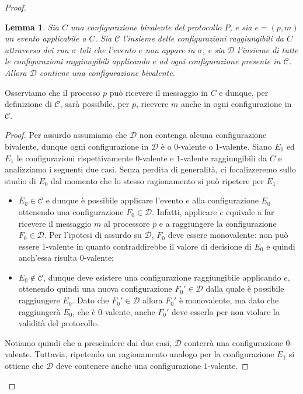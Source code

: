\documentclass{article}
\newtheorem{lemma}{Lemma}
\begin{document}
\begin{proof}
\begin{lemma}
\label{lemma:oneStepFromConfigInCYieldConfigInD}
Sia $C$ una configurazione bivalente del protocollo $P$, e sia
$e=(p,m)$ un evento applicabile a $C$. Sia $\mathcal{C}$ l'insieme
delle configurazioni raggiungibili da $C$ attraverso dei run $\sigma$
tali che l'evento $e$ non appare in $\sigma$, e sia $\mathcal{D}$
l'insieme di tutte le configurazioni raggiungibili applicando $e$ ad
ogni configurazione presente in $\mathcal{C}$. Allora $\mathcal{D}$
contiene una configurazione bivalente.
\end{lemma}
Osserviamo che il processo $p$ può ricevere il messaggio in $C$ e
dunque, per definizione di $\mathcal{C}$, sarà possibile, per $p$,
ricevere $m$ anche in ogni configurazione in $\mathcal{C}$.
\begin{proof}
  Per assurdo assumiamo che $\mathcal{D}$ non contenga alcuna
  configurazione bivalente, dunque ogni configurazione in
  $\mathcal{D}$ è o $0$-valente o $1$-valente. Siano $E_0$ ed $E_1$ le
  configurazioni rispettivamente $0$-valente e $1$-valente
  raggiungibili da $C$ e analizziamo i seguenti due casi. Senza
  perdita di generalità, ci focalizzeremo sullo studio di $E_0$ dal
  momento che lo stesso ragionamento si può ripetere per $E_1$:
\begin{itemize}
\item $E_0 \in \mathcal{C}$ e dunque è possibile applicare l'evento
  $e$ alla configurazione $E_0$ ottenendo una configurazione $F_0 \in
  \mathcal{D}$. Infatti, applicare $e$ equivale a far ricevere il
  messaggio $m$ al processore $p$ e a raggiungere la configurazione
  $F_0 \in \mathcal{D}$. Per l'ipotesi di assurdo su $\mathcal{D}$,
  $F_0$ deve essere monovalente: non può essere $1$-valente in quanto
  contraddirebbe il valore di decisione di $E_0$ e quindi anch'essa
  risulta $0$-valente;
\item $E_0 \not \in \mathcal{C}$, dunque deve esistere una
  configurazione raggiungibile applicando $e$, ottenendo quindi una
  nuova configurazione $F_0' \in \mathcal{D}$ dalla quale è possibile
  raggiungere $E_0$. Dato che $F_0' \in \mathcal{D}$ allora $F_0'$ \`e
  monovalente, ma dato che raggiunger\`a $E_0$, che è $0$-valente,
  anche $F_0'$ deve esserlo per non violare la validità del
  protocollo.
\end{itemize}
Notiamo quindi che a prescindere dai due casi, $\mathcal{D}$ conterrà
una configurazione $0$-valente. Tuttavia, ripetendo un ragionamento
analogo per la configurazione $E_1$ si ottiene che $\mathcal{D}$ deve
contenere anche una configurazione $1$-valente.


\end{proof}
\end{proof}
\end{document}
